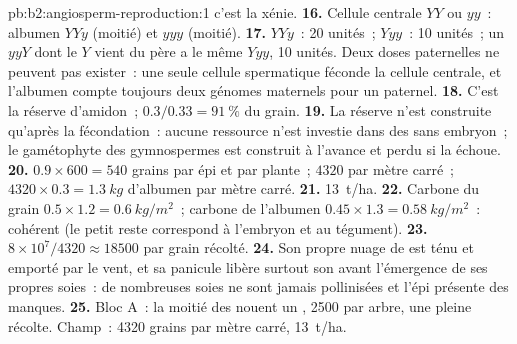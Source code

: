\begin{solution}{pb:b2:angiosperm-reproduction:1}
c'est la xénie.
\textbf{16.} Cellule centrale $YY$ ou $yy$~: albumen $YYy$ (moitié) et
$yyy$ (moitié).
\textbf{17.} $YYy$~: 20 unités~; $Yyy$~: 10 unités~; un $yyY$ dont le $Y$
vient du père a le même  $Yyy$, 10 unités. Deux doses
paternelles ne peuvent pas exister~: une seule cellule spermatique
féconde la cellule centrale, et l'albumen compte toujours deux génomes
maternels pour un paternel.
\textbf{18.} C'est la réserve d'amidon~; $0.3/0.33 = \qty{91}{\%}$ du
grain.
\textbf{19.} La réserve n'est construite qu'après la fécondation~: aucune
ressource n'est investie dans des  sans embryon~; le gamétophyte
des gymnospermes est construit à l'avance et perdu si la 
échoue.
\textbf{20.} $0.9\times 600 = 540$ grains par épi et par plante~;
$4320$ par mètre carré~; $4320\times 0.3 = \qty{1.3}{kg}$ d'albumen
par mètre carré.
\textbf{21.} \qty{13}{t/ha}.
\textbf{22.} Carbone du grain $0.5\times 1.2 = \qty{0.6}{kg/m^2}$~;
carbone de l'albumen $0.45\times 1.3 = \qty{0.58}{kg/m^2}$~: cohérent
(le petit reste correspond à l'embryon et au tégument).
\textbf{23.} $8\times 10^{7}/4320 \approx \num{18500}$ 
par grain récolté.
\textbf{24.} Son propre nuage de  est ténu et emporté par le vent,
et sa panicule libère surtout son  avant l'émergence de ses propres
soies~: de nombreuses soies ne sont jamais pollinisées et l'épi présente
des manques.
\textbf{25.} Bloc A~: la moitié des  nouent un , 2500 par
arbre, une pleine récolte. Champ~: 4320 grains par mètre carré,
\qty{13}{t/ha}.
\end{solution}
